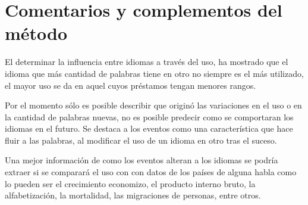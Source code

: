 \section{Comentarios y complementos del método} %


El determinar la influencia entre idiomas a través del uso, ha mostrado que el idioma que más cantidad de palabras tiene en otro no siempre es el más utilizado, el mayor uso se da en aquel cuyos préstamos tengan menores rangos. 

Por el momento sólo es posible describir que originó las variaciones en el uso o en la cantidad de palabras nuevas, no es posible predecir como se comportaran los idiomas en el futuro. Se destaca a los eventos como una característica que  hace fluir a las palabras, al modificar el uso de un idioma en otro tras el suceso. 


Una mejor información de como los eventos alteran a los idiomas se podría extraer si se comparará el uso con con  datos de los países de alguna habla como lo pueden ser  el crecimiento economizo, el producto interno bruto, la alfabetización, la mortalidad, las migraciones de personas, entre otros. 



 





